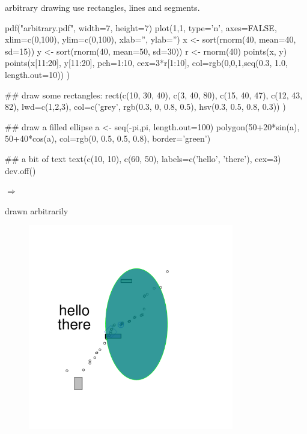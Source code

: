 \documentclass[pdf]{beamer}
\begin{document}
\begin{frame}[fragile]{arbitrary drawing}
  use rectangles, lines and segments.
  
  \begin{rcode}
    pdf("arbitrary.pdf", width=7, height=7)
    plot(1,1, type='n', axes=FALSE, xlim=c(0,100), ylim=c(0,100), xlab='', ylab='')
    x <- sort(rnorm(40, mean=40, sd=15))
    y <- sort(rnorm(40, mean=50, sd=30))
    r <- rnorm(40)
    points(x, y)
    points(x[11:20], y[11:20], pch=1:10, cex=3*r[1:10], 
           col=rgb(0,0,1,seq(0.3, 1.0, length.out=10)) )
    
    ## draw some rectangles:
    rect(c(10, 30, 40), c(3, 40, 80), c(15, 40, 47), c(12, 43, 82), lwd=c(1,2,3),
         col=c('grey', rgb(0.3, 0, 0.8, 0.5), hsv(0.3, 0.5, 0.8, 0.3)) )

    ## draw a filled ellipse
    a <- seq(-pi,pi, length.out=100)
    polygon(50+20*sin(a), 50+40*cos(a), col=rgb(0, 0.5, 0.5, 0.8), border='green') 
    
    ## a bit of text
    text(c(10, 10), c(60, 50), labels=c('hello', 'there'), cex=3)
    dev.off()
  \end{rcode}
  
  \huge $\Rightarrow$
\end{frame}

\begin{frame}{drawn arbitrarily}
  \begin{figure}[ht]
    \includegraphics[width=0.8\textwidth]{images/arbitrary}
  \end{figure}
\end{frame}
\end{document}
